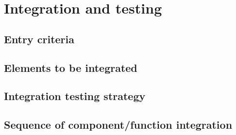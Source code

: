     \section{Integration and testing}
        \subsection{Entry criteria}
        \subsection{Elements to be integrated}
        \subsection{Integration testing strategy}
        \subsection{Sequence of component/function integration}
    